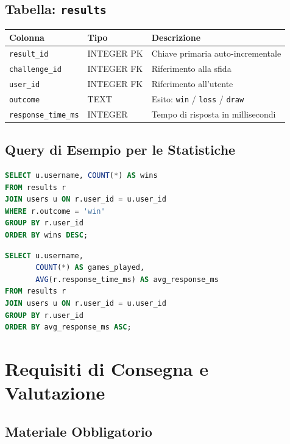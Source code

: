 \documentclass[12pt, a4paper]{article}
\newcommand{\code}[1]{\texttt{#1}}
\begin{document}
\subsection{Tabella: \texttt{results}}

\begin{longtable}{|p{3.5cm}|p{2.5cm}|p{7cm}|}
    \hline
    \rowcolor{primaryBlue!20}
    \textbf{Colonna} & \textbf{Tipo} & \textbf{Descrizione} \\
    \hline
    \endhead
    \code{result\_id} & INTEGER PK & Chiave primaria auto-incrementale \\
    \hline
    \code{challenge\_id} & INTEGER FK & Riferimento alla sfida \\
    \hline
    \code{user\_id} & INTEGER FK & Riferimento all'utente \\
    \hline
    \code{outcome} & TEXT & Esito: \code{win} / \code{loss} / \code{draw} \\
    \hline
    \code{response\_time\_ms} & INTEGER & Tempo di risposta in millisecondi \\
    \hline
\end{longtable}

\subsection{Query di Esempio per le Statistiche}

\begin{lstlisting}[language=SQL, caption={Numero di vittorie per utente}]
SELECT u.username, COUNT(*) AS wins
FROM results r
JOIN users u ON r.user_id = u.user_id
WHERE r.outcome = 'win'
GROUP BY r.user_id
ORDER BY wins DESC;
\end{lstlisting}

\begin{lstlisting}[language=SQL, caption={Tempo medio di risposta per utente}]
SELECT u.username,
       COUNT(*) AS games_played,
       AVG(r.response_time_ms) AS avg_response_ms
FROM results r
JOIN users u ON r.user_id = u.user_id
GROUP BY r.user_id
ORDER BY avg_response_ms ASC;
\end{lstlisting}

\newpage
\section{Requisiti di Consegna e Valutazione}

\subsection{Materiale Obbligatorio}
\end{document}
